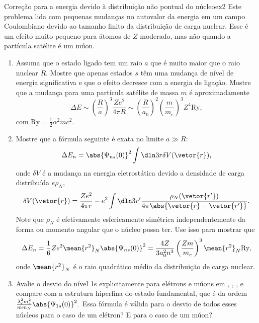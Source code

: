 \begin{exercício}{Correção para a energia devido à distribuição não pontual do núcleo}{ex2}
   Este problema lida com pequenas mudanças no autovalor da energia em um campo Coulombiano devido ao tamanho finito da distribuição de carga nuclear. Esse é um efeito muito pequeno para átomos de \(Z\) moderado, mas não quando a partícula satélite é um múon.
   \begin{enumerate}[label=(\alph*)]
         \item Assuma que o estado ligado tem um raio \(a\) que é muito maior que o raio nuclear \(R.\) Mostre que apenas estados \(s\) têm uma mudança de nível de energia significativa e que o efeito decresce com a energia de ligação. Mostre que a mudança para uma partícula satélite de massa \(m\) é aproximadamente
            \begin{equation*}
               \Delta E \sim \left(\frac{R}{a}\right)^3 \frac{Z e^2}{4\pi R} \sim \left(\frac{R}{a_0}\right)^2 \left(\frac{m}{m_e}\right)^3 Z^4 \mathrm{Ry},
            \end{equation*}
            com \(\mathrm{Ry} = \frac12 \alpha^2 m c^2.\)
         \item Mostre que a fórmula seguinte é exata no limite \(a \gg R\):
            \begin{equation*}
               \Delta E_n = \abs{\Psi_{ns}(0)}^2 \int \dln3r \delta V(\vetor{r}),
            \end{equation*}
            onde \(\delta V\) é a mudança na energia eletrostática devido a densidade de carga distribuída \(e \rho_N,\)
            \begin{equation*}
               \delta V(\vetor{r}) = \frac{Z e^2}{4\pi r} - e^2 \int \dln3{r'} \frac{\rho_N(\vetor{r'})}{4\pi \abs{\vetor{r} - \vetor{r'}}}.
            \end{equation*}
            Note que \(\rho_N\) é efetivamente esfericamente simétrica independentemente da forma ou momento angular que o núcleo possa ter. Use isso para mostrar que
            \begin{equation*}
               \Delta E_n = \frac16 Z e^2 \mean{r^2}_N \abs{\Psi_{ns}(0)}^2 = \frac{4 Z}{3a_0^2n^3}\left(\frac{Z m}{m_e}\right)^3 \mean{r^2}_N \mathrm{Ry},
            \end{equation*}
            onde \(\mean{r^2}_N\) é o raio quadrático médio da distribuição de carga nuclear.
         \item Avalie o desvio do nível 1s explicitamente para elétrons e múons em , , , e compare com a estrutura hiperfina do estado fundamental, que é da ordem \(\frac{\lambda_c^2 m_e^2}{mm_N}\abs{\Psi_{1s}(0)}^2.\) Essa fórmula é válida para o desvio de todos esses núcleos para o caso de um elétron? E para o caso de um múon?
   \end{enumerate}
\end{exercício}
